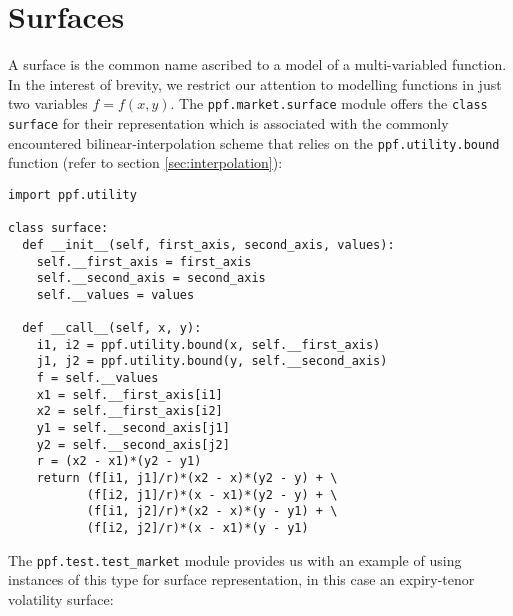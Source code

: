 \section{Surfaces}
A surface is the common name ascribed to a model of a multi-variabled
function. In the interest of brevity, we restrict our attention to
modelling functions in just two variables $f = f(x, y)$. The
\verb|ppf.market.surface| module offers the \verb|class surface| for
their representation which is associated with the commonly encountered
bilinear-interpolation scheme that relies on the
\verb|ppf.utility.bound| function (refer to section
\ref{sec:interpolation}):
\begin{verbatim}
import ppf.utility

class surface:
  def __init__(self, first_axis, second_axis, values):
    self.__first_axis = first_axis
    self.__second_axis = second_axis
    self.__values = values

  def __call__(self, x, y):
    i1, i2 = ppf.utility.bound(x, self.__first_axis)
    j1, j2 = ppf.utility.bound(y, self.__second_axis)
    f = self.__values
    x1 = self.__first_axis[i1]
    x2 = self.__first_axis[i2]
    y1 = self.__second_axis[j1]
    y2 = self.__second_axis[j2]
    r = (x2 - x1)*(y2 - y1)
    return (f[i1, j1]/r)*(x2 - x)*(y2 - y) + \
           (f[i2, j1]/r)*(x - x1)*(y2 - y) + \
           (f[i1, j2]/r)*(x2 - x)*(y - y1) + \
           (f[i2, j2]/r)*(x - x1)*(y - y1)
\end{verbatim}
The \verb|ppf.test.test_market| module provides us with an example of
using instances of this type for surface representation, in this case
an expiry-tenor volatility surface:
